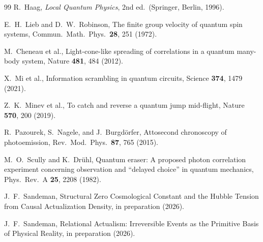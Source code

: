 \documentclass[11pt,twocolumn]{article}
\begin{document}
\begin{thebibliography}{99}
R.~Haag,
\emph{Local Quantum Physics}, 2nd ed.\
(Springer, Berlin, 1996).

E.~H.~Lieb and D.~W.~Robinson,
The finite group velocity of quantum spin systems,
Commun.\ Math.\ Phys.\ \textbf{28}, 251 (1972).

M.~Cheneau et al.,
Light-cone-like spreading of correlations in a quantum many-body system,
Nature \textbf{481}, 484 (2012).

X.~Mi et al.,
Information scrambling in quantum circuits,
Science \textbf{374}, 1479 (2021).

Z.~K.~Minev et al.,
To catch and reverse a quantum jump mid-flight,
Nature \textbf{570}, 200 (2019).

R.~Pazourek, S.~Nagele, and J.~Burgd\"{o}rfer,
Attosecond chronoscopy of photoemission,
Rev.\ Mod.\ Phys.\ \textbf{87}, 765 (2015).

M.~O.~Scully and K.~Dr\"{u}hl,
Quantum eraser: A proposed photon correlation experiment concerning
observation and ``delayed choice'' in quantum mechanics,
Phys.\ Rev.\ A \textbf{25}, 2208 (1982).

J.~F.~Sandeman,
Structural Zero Cosmological Constant and the Hubble Tension from
Causal Actualization Density,
in preparation (2026).

J.~F.~Sandeman,
Relational Actualism: Irreversible Events as the Primitive Basis of
Physical Reality,
in preparation (2026).

\end{thebibliography}
\end{document}
